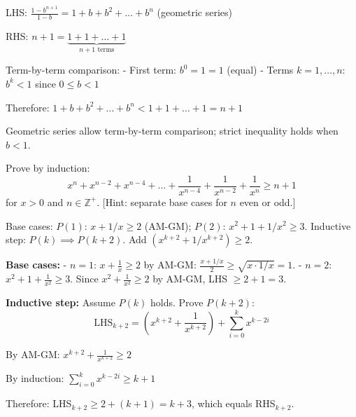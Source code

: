 \begin{solution}
LHS: $\frac{1-b^{n+1}}{1-b} = 1 + b + b^2 + \dots + b^n$ (geometric series)

RHS: $n+1 = \underbrace{1 + 1 + \dots + 1}_{n+1 \text{ terms}}$

Term-by-term comparison:
- First term: $b^0 = 1 = 1$ (equal)
- Terms $k=1,\ldots,n$: $b^k < 1$ since $0 \le b < 1$

Therefore: $1 + b + b^2 + \dots + b^n < 1 + 1 + \dots + 1 = n+1$

\end{solution}

\begin{takeaways}
Geometric series allow term-by-term comparison; strict inequality holds when $b<1$.
\end{takeaways}

\vspace{1cm}

\begin{problem}
Prove by induction:
$$x^n + x^{n-2} + x^{n-4} + \dots + \frac{1}{x^{n-4}} + \frac{1}{x^{n-2}} + \frac{1}{x^n} \geq n+1$$
for $x > 0$ and $n \in \mathbb{Z}^+$. [Hint: separate base cases for $n$ even or odd.]
\end{problem}

\vspace{0.5cm}
\begin{hintbox}
Base cases: $P(1)$: $x+1/x \ge 2$ (AM-GM); $P(2)$: $x^2+1+1/x^2 \ge 3$. Inductive step: $P(k) \implies P(k+2)$. Add $(x^{k+2}+1/x^{k+2}) \ge 2$.
\end{hintbox}

\begin{solution}
\textbf{Base cases:}
- $n=1$: $x + \frac{1}{x} \ge 2$ by AM-GM: $\frac{x+1/x}{2} \ge \sqrt{x \cdot 1/x} = 1$.
- $n=2$: $x^2 + 1 + \frac{1}{x^2} \ge 3$. Since $x^2 + \frac{1}{x^2} \ge 2$ by AM-GM, LHS $\ge 2+1=3$.

\textbf{Inductive step:} Assume $P(k)$ holds. Prove $P(k+2)$:
$$
\text{LHS}_{k+2} = (x^{k+2} + \frac{1}{x^{k+2}}) + \sum_{i=0}^k x^{k-2i}
$$

By AM-GM: $x^{k+2} + \frac{1}{x^{k+2}} \ge 2$

By induction: $\sum_{i=0}^k x^{k-2i} \ge k+1$

Therefore: LHS$_{k+2} \ge 2 + (k+1) = k+3$, which equals RHS$_{k+2}$.

\end{solution}

